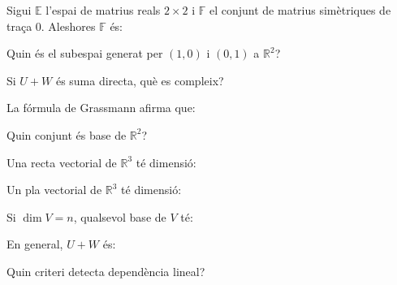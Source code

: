 \bigskip{}\par\medskip
{}
\begin{enumerate}
\pregunta Sigui $\mathbb E$ l’espai de matrius reals $2\times2$ i $\mathbb F$ el conjunt de matrius simètriques de traça $0$. Aleshores $\mathbb F$ és:
\begin{enumerate}
\end{enumerate}\feedback
\pregunta Quin és el subespai generat per $(1,0)$ i $(0,1)$ a $\mathbb R^2$?
\begin{enumerate}
\end{enumerate}\feedback
\pregunta Si $U+W$ és suma directa, què es compleix?
\begin{enumerate}
\end{enumerate}\feedback
\pregunta La fórmula de Grassmann afirma que:
\begin{enumerate}
\end{enumerate}\feedback
\pregunta Quin conjunt és base de $\mathbb R^2$?
\begin{enumerate}
\end{enumerate}\feedback
\pregunta Una recta vectorial de $\mathbb R^3$ té dimensió:
\begin{enumerate}
\end{enumerate}\feedback
\pregunta Un pla vectorial de $\mathbb R^3$ té dimensió:
\begin{enumerate}
\end{enumerate}\feedback
\pregunta Si $\dim V=n$, qualsevol base de $V$ té:
\begin{enumerate}
\end{enumerate}\feedback
\pregunta En general, $U+W$ és:
\begin{enumerate}
\end{enumerate}\feedback
\pregunta Quin criteri detecta dependència lineal?
\begin{enumerate}
\end{enumerate}\feedback
\end{enumerate}